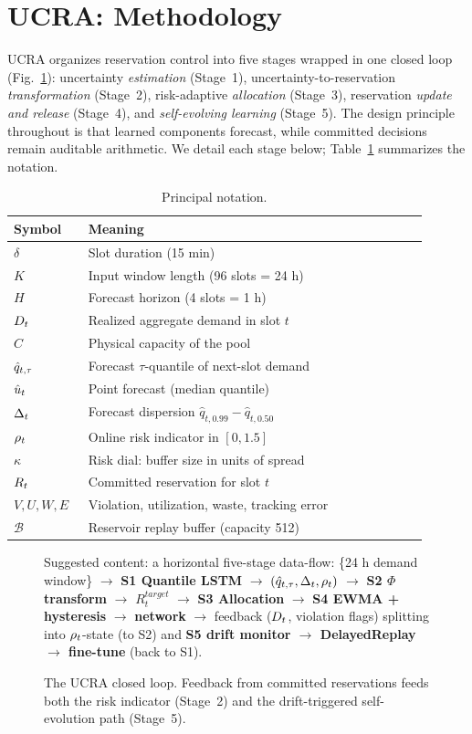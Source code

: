 \section{UCRA: Methodology}
\label{sec:method}

UCRA organizes reservation control into five stages wrapped in one
closed loop (Fig.~\ref{fig:pipeline}): uncertainty \emph{estimation}
(Stage~1), uncertainty-to-reservation \emph{transformation}
(Stage~2), risk-adaptive \emph{allocation} (Stage~3), reservation
\emph{update and release} (Stage~4), and \emph{self-evolving
learning} (Stage~5). The design principle throughout is that learned
components forecast, while committed decisions remain auditable
arithmetic. We detail each stage below; Table~\ref{tab:notation}
summarizes the notation.

\begin{table}[!t]
\caption{Principal notation.}
\label{tab:notation}
\centering
\small
\begin{tabular}{@{}p{0.16\linewidth}p{0.74\linewidth}@{}}
\toprule
Symbol & Meaning \\
\midrule
$\delta$ & Slot duration (15 min) \\
$K$ & Input window length (96 slots = 24 h) \\
$H$ & Forecast horizon (4 slots = 1 h) \\
$D_t$ & Realized aggregate demand in slot $t$ \\
$C$ & Physical capacity of the pool \\
$\hat{q}_{t,\tau}$ & Forecast $\tau$-quantile of next-slot demand \\
$\hat{u}_t$ & Point forecast (median quantile) \\
$\Delta_t$ & Forecast dispersion $\hat q_{t,0.99} - \hat q_{t,0.50}$ \\
$\rho_t$ & Online risk indicator in $[0, 1.5]$ \\
$\kappa$ & Risk dial: buffer size in units of spread \\
$R_t$ & Committed reservation for slot $t$ \\
$V, U, W, E$ & Violation, utilization, waste, tracking error \\
$\mathcal{B}$ & Reservoir replay buffer (capacity 512) \\
\bottomrule
\end{tabular}
\end{table}

\begin{figure}[!t]
\centering
{}
{Suggested content: a horizontal five-stage data-flow: \{24 h demand
window\} $\rightarrow$ \textbf{S1 Quantile LSTM} $\rightarrow$
$(\hat{q}_{t,\tau}, \Delta_t, \rho_t)$ $\rightarrow$ \textbf{S2 $\Phi$ transform}
$\rightarrow$ $R^{target}_t$ $\rightarrow$ \textbf{S3 Allocation}
$\rightarrow$ \textbf{S4 EWMA + hysteresis} $\rightarrow$ \textbf{network}
$\rightarrow$ feedback ($D_t$, violation flags) splitting into
$\rho_t$-state (to S2) and \textbf{S5 drift monitor $\rightarrow$
DelayedReplay $\rightarrow$ fine-tune} (back to S1).}
\caption{The UCRA closed loop. Feedback from committed reservations
feeds both the risk indicator (Stage~2) and the drift-triggered
self-evolution path (Stage~5).}
\label{fig:pipeline}
\end{figure}

